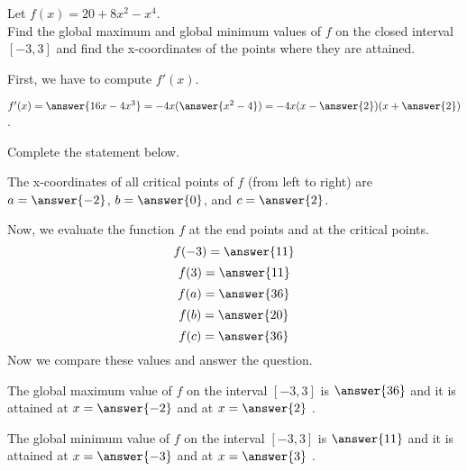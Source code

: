 \documentclass{ximera}
\begin{document}
\author{Nela Lakos}


\begin{exercise}

Let $f(x) = 20 + 8x^2 - x^4$.\\
 Find  the global maximum and global minimum values of $f$ on the closed interval $[-3,3]$ and find the x-coordinates of the points where they are attained.
\begin{hint}
 First, we have to compute $f'(x)$.

$f'(x) = \answer{16x-4x^3}=-4x(\answer{x^2-4})=-4x(x-\answer{2})(x+\answer{2})$.

Complete the statement below.

The  x-coordinates of all critical points of $f$ (from left to right) are $a=\answer{-2}$, $b=\answer{0}$, and $c=\answer{2}$.
\end{hint}
\begin{hint}
Now, we evaluate the function $f$ at the end points and at the critical points.
$$
f(-3) = \answer{11}
$$
$$
f(3) = \answer{11}
$$
$$
f(a) = \answer{36}
$$
$$
f(b) = \answer{20}
$$
$$
f(c) = \answer{36}
$$
Now we compare these values and answer the question.
\end{hint}
The global maximum value of $f$ on the interval $[-3,3]$ is $\answer{36}$ and it is attained at $x=\answer{-2}$ and at  $x=\answer{2}$  .

The global minimum value of $f$ on the interval $[-3,3]$ is $\answer{11}$ and it is attained  at $x=\answer{-3}$ and at $x=\answer{3}$ .

\end{exercise}
\end{document}
